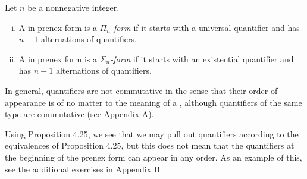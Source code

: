 \setcounter{definition}{29}
\begin{definition}
  Let \(n\) be a nonnegative integer.
  \begin{enumerate}[(i)]
    \item A \wf{} in prenex form is a \textit{\(\Pi_n\)-form} if it starts with a universal quantifier and has \(n - 1\) alternations of quantifiers.

    \item A \wf{} in prenex form is a \textit{\(\Sigma_n\)-form} if it starts with an existential quantifier and has \(n - 1\) alternations of quantifiers.
  \end{enumerate}
\end{definition}

In general, quantifiers are not commutative in the sense that their order of appearance is of no matter to the meaning of a \wf{}, although quantifiers of the same type are commutative (see Appendix A).

Using Proposition 4.25, we see that we may pull out quantifiers according to the equivalences of Proposition 4.25, but this does not mean that the quantifiers at the beginning of the prenex form can appear in any order. As an example of this, see the additional exercises in Appendix B.

